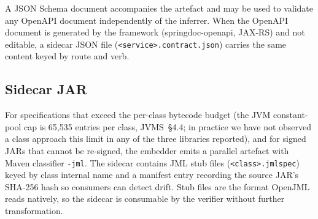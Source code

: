 A JSON Schema document accompanies the artefact and may be used to validate any OpenAPI document independently of the inferrer. When the OpenAPI document is generated by the framework (springdoc-openapi, JAX-RS) and not editable, a sidecar JSON file (\texttt{<service>.contract.json}) carries the same content keyed by route and verb.

\subsection{Sidecar JAR}

For specifications that exceed the per-class bytecode budget (the JVM constant-pool cap is 65{,}535 entries per class, JVMS~\S4.4; in practice we have not observed a class approach this limit in any of the three libraries reported), and for signed JARs that cannot be re-signed, the embedder emits a parallel artefact with Maven classifier \texttt{-jml}. The sidecar contains JML stub files (\texttt{<class>.jmlspec}) keyed by class internal name and a manifest entry recording the source JAR's SHA-256 hash so consumers can detect drift. Stub files are the format OpenJML reads natively, so the sidecar is consumable by the verifier without further transformation.
